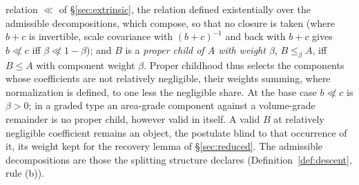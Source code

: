 \begin{defin}
relation $\ll$ of \S\ref{sec:extrinsic}, the relation defined existentially over the admissible decompositions, which compose, so that no closure is taken (where $b + c$ is invertible, scale covariance with $(b+c)^{-1}$ and back with $b + c$ gives $b \not\ll c$ iff $\beta \not\ll 1 - \beta$); and $B$ is a \emph{proper child of $A$ with weight $\beta$}, $B \le_\beta A$, iff $B \le A$ with component weight $\beta$. Proper childhood thus selects the components whose coefficients are not relatively negligible, their weights summing, where normalization is defined, to one less the negligible share.  At the base case $b \not\ll c$ is $\beta > 0$; in a graded type an area-grade component against a volume-grade remainder is no proper child, however valid in itself. A valid $B$ at relatively negligible coefficient remains an object, the postulate blind to that occurrence of it, its weight kept for the recovery lemma of \S\ref{sec:reduced}. The admissible decompositions are those the splitting structure declares (Definition~\ref{def:descent}, rule (b)).
\end{defin}

